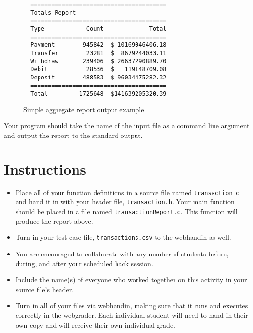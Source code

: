 \documentclass[12pt]{scrartcl}
\begin{document}
\begin{figure}[ht]
\begin{verbatim}
  =======================================
  Totals Report
  =======================================
  Type            Count             Total
  =======================================
  Payment        945842  $ 10169046406.18
  Transfer        23281  $  8679244033.11
  Withdraw       239406  $ 26637290889.70
  Debit           28536  $   119148709.08
  Deposit        488583  $ 96034475282.32
  =======================================
  Total         1725648  $141639205320.39
\end{verbatim}
\caption{Simple aggregate report output example}
\label{figure:simpleReport}
\end{figure}

Your program should take the name of the input file as a command line argument
and output the report to the standard output.


\section*{Instructions}

\begin{itemize}

  \item Place all of your function definitions in a source file named 
  \texttt{transaction.c} and hand it in with your header file, 
  \texttt{transaction.h}.  Your main function should be
  placed in a file named \texttt{transactionReport.c}.  This
  function will produce the report above.

  \item Turn in your test case file, \texttt{transactions.csv}
  to the webhandin as well.

  \item You are encouraged to collaborate with any number of students 
  before, during, and after your scheduled hack session.  

  \item Include the name(s) of everyone who worked together on
  this activity in your source file's header.

  \item Turn in all of your files via webhandin, making sure that 
  it runs and executes correctly in the webgrader.  Each individual 
  student will need to hand in their own copy and will receive 
  their own individual grade.
\end{itemize}  
\end{document}
